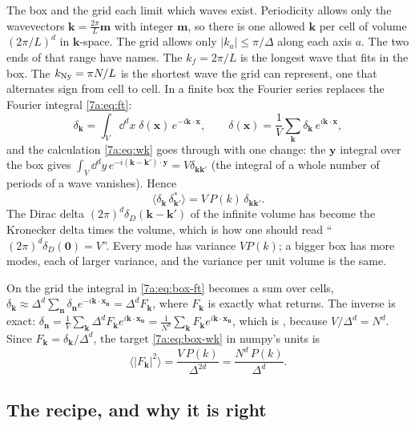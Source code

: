 The box and the grid each limit which waves exist. Periodicity allows only the
wavevectors $\bm k=\frac{2\pi}{L}\bm m$ with integer $\bm m$, so there is one
allowed $\bm k$ per cell of volume $(2\pi/L)^d$ in $\bm k$-space. The grid allows
only $|k_a|\le\pi/\Delta$ along each axis $a$. The two ends of that range have
names. The  $k_f=2\pi/L$ is the longest wave that fits
in the box. The  $k_{\rm Ny}=\pi N/L$ is the shortest
wave the grid can represent, one that alternates sign from cell to cell. In a
finite box the Fourier series replaces the Fourier integral \eqref{7a:eq:ft}:
\begin{equation}
  \delta_{\bm k}=\int_V\dd^dx\;\delta(\bm x)\,e^{-i\bm k\cdot\bm x},
  \qquad
  \delta(\bm x)=\frac1V\sum_{\bm k}\delta_{\bm k}\,e^{i\bm k\cdot\bm x},
  \label{7a:eq:box-ft}
\end{equation}
and the calculation \eqref{7a:eq:wk} goes through with one change: the $\bm y$
integral over the box gives $\int_V\dd^dy\,e^{-i(\bm k-\bm k')\cdot\bm y}=V\delta_{\bm k\bm k'}$
(the integral of a whole number of periods of a wave vanishes). Hence
\begin{equation}
  \langle\delta_{\bm k}\,\delta_{\bm k'}^*\rangle=V\,P(k)\,\delta_{\bm k\bm k'} .
  \label{7a:eq:box-wk}
\end{equation}
The Dirac delta $(2\pi)^d\delta_D(\bm k-\bm k')$ of the infinite volume has become
the Kronecker delta times the volume, which is how one should read
``$(2\pi)^d\delta_D(\bm 0)=V$''. Every mode has variance $VP(k)$; a bigger box
has more modes, each of larger variance, and the variance per unit volume is the
same.

On the grid the integral in \eqref{7a:eq:box-ft} becomes a sum over cells,
$\delta_{\bm k}\approx\Delta^d\sum_{\bm n}\delta_{\bm n}e^{-i\bm k\cdot\bm x_{\bm n}}=\Delta^dF_{\bm k}$,
where $F_{\bm k}$ is exactly what  returns. The inverse is
exact: $\delta_{\bm n}=\frac1V\sum_{\bm k}\Delta^dF_{\bm k}e^{i\bm k\cdot\bm x_{\bm n}}
=\frac{1}{N^d}\sum_{\bm k}F_{\bm k}e^{i\bm k\cdot\bm x_{\bm n}}$, which is
, because $V/\Delta^d=N^d$. Since
$F_{\bm k}=\delta_{\bm k}/\Delta^d$, the target \eqref{7a:eq:box-wk} in numpy's
units is
\begin{equation}
  \langle|F_{\bm k}|^2\rangle=\frac{V\,P(k)}{\Delta^{2d}}=\frac{N^d\,P(k)}{\Delta^d}.
  \label{7a:eq:fft-target}
\end{equation}

\subsection{The recipe, and why it is right}
\label{7a:sec:recipe}

